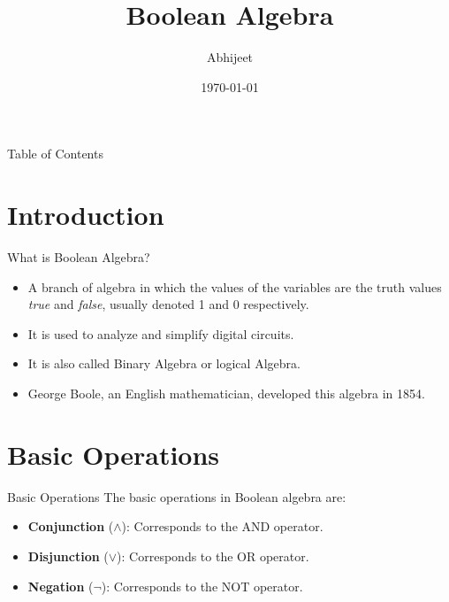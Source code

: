 \documentclass{beamer}
\title{Boolean Algebra}
\author{Abhijeet}
\date{\today}
\begin{document}
\begin{frame}
    \titlepage
\end{frame}

\begin{frame}{Table of Contents}
    \tableofcontents
\end{frame}

\section{Introduction}
\begin{frame}{What is Boolean Algebra?}
    \begin{itemize}
        \item A branch of algebra in which the values of the variables are the
        truth values \textit{true} and \textit{false}, usually denoted 1 and 0
        respectively.
        \item It is used to analyze and simplify digital circuits.
        \item It is also called Binary Algebra or logical Algebra.
        \item George Boole, an English mathematician, developed this algebra in
        1854.
    \end{itemize}
\end{frame}

\section{Basic Operations}
\begin{frame}{Basic Operations}
    The basic operations in Boolean algebra are:
    \begin{itemize}
        \item \textbf{Conjunction} ($\land$): Corresponds to the AND operator.
        \item \textbf{Disjunction} ($\lor$): Corresponds to the OR operator.
        \item \textbf{Negation} ($\neg$): Corresponds to the NOT operator.
    \end{itemize}
\end{frame}
\end{document}

